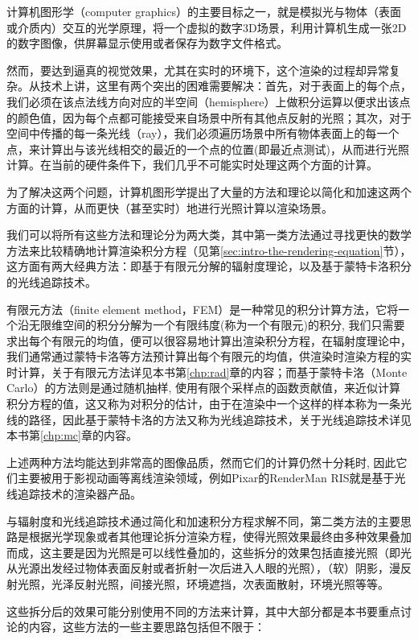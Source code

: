 计算机图形学（computer graphics）的主要目标之一，就是模拟光与物体（表面或介质内）交互的光学原理，将一个虚拟的数字3D场景，利用计算机生成一张2D的数字图像，供屏幕显示使用或者保存为数字文件格式。

然而，要达到逼真的视觉效果，尤其在实时的环境下，这个渲染的过程却异常复杂。从技术上讲，这里有两个突出的困难需要解决：首先，对于表面上的每个点，我们必须在该点法线方向对应的半空间（hemisphere）上做积分运算以便求出该点的颜色值，因为每个点都可能接受来自场景中所有其他点反射的光照；其次，对于空间中传播的每一条光线（ray），我们必须遍历场景中所有物体表面上的每一个点，来计算出与该光线相交的最近的一个点的位置(即最近点测试)，从而进行光照计算。在当前的硬件条件下，我们几乎不可能实时处理这两个方面的计算。

为了解决这两个问题，计算机图形学提出了大量的方法和理论以简化和加速这两个方面的计算，从而更快（甚至实时）地进行光照计算以渲染场景。

我们可以将所有这些方法和理论分为两大类，其中第一类方法通过寻找更快的数学方法来比较精确地计算渲染积分方程（见第\ref{sec:intro-the-rendering-equation}节），这方面有两大经典方法：即基于有限元分解的辐射度理论，以及基于蒙特卡洛积分的光线追踪技术。

有限元方法（finite element method，FEM）是一种常见的积分计算方法，它将一个沿无限维空间的积分分解为一个有限纬度(称为一个有限元)的积分, 我们只需要求出每个有限元的均值，便可以很容易地计算出渲染积分方程，在辐射度理论中，我们通常通过蒙特卡洛等方法预计算出每个有限元的均值，供渲染时渲染方程的实时计算，关于有限元方法详见本书第\ref{chp:rad}章的内容；而基于蒙特卡洛（Monte Carlo）的方法则是通过随机抽样, 使用有限个采样点的函数贡献值，来近似计算积分方程的值，这又称为对积分的估计，由于在渲染中一个这样的样本称为一条光线的路径，因此基于蒙特卡洛的方法又称为光线追踪技术，关于光线追踪技术详见本书第\ref{chp:mc}章的内容。

上述两种方法均能达到非常高的图像品质，然而它们的计算仍然十分耗时, 因此它们主要被用于影视动画等离线渲染领域，例如Pixar的RenderMan RIS就是基于光线追踪技术的渲染器产品。

与辐射度和光线追踪技术通过简化和加速积分方程求解不同，第二类方法的主要思路是根据光学现象或者其他理论拆分渲染方程，使得光照效果最终由多种效果叠加而成，这主要是因为光照是可以线性叠加的，这些拆分的效果包括直接光照（即光从光源出发经过物体表面反射或者折射一次后进入人眼的光照），（软）阴影，漫反射光照，光泽反射光照，间接光照，环境遮挡，次表面散射，环境光照等等。

这些拆分后的效果可能分别使用不同的方法来计算，其中大部分都是本书要重点讨论的内容，这些方法的一些主要思路包括但不限于：

